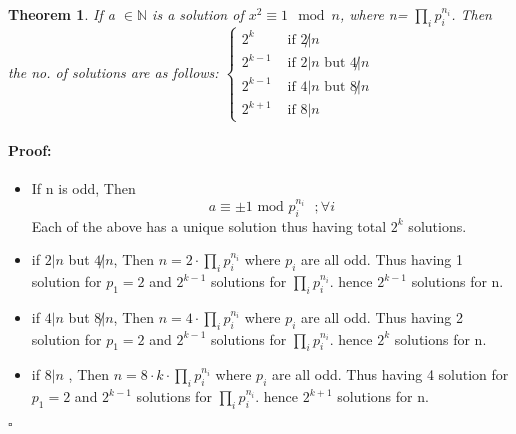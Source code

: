 \documentclass{report}
\newtheorem{theorem}{Theorem}[section]
\renewenvironment{proof}{\paragraph{Proof:}}{\hfill$\square$}
\begin{document}
\begin{theorem}
   
If a $\in \mathbb{N}$ is a solution of $x^2\equiv 1 \mod n$, where n= $\prod_i p_i^{n_i}$. Then the no. of solutions are as follows:
$\begin{cases}
    2^k & \textrm{  if  } 2\not| n\\
    2^{k-1} & \textrm{  if  } 2|n \textrm{  but  } 4\not| n\\
    2^{k-1} & \textrm{  if  } 4|n \textrm{  but  } 8\not|n\\
    2^{k+1} &\textrm{  if  } 8|n
\end{cases}
$
\end{theorem}
\begin{proof}
\begin{itemize}
    \item  If n is odd, Then $$a\equiv \pm 1 \textrm{  mod $p_i^{n_i}  $  }; \forall i   $$ 
    Each of the above has a unique solution thus having total $2^k$ solutions.
    \item if $2|n$ but $4\not|n$, Then $n=2\cdot \prod_i p_i^{n_i}$ where $p_i $ are all odd.
    Thus having 1 solution for $p_1=2$ and $2^{k-1}$ solutions for $\prod_i p_i^{n_i}$. hence $2^{k-1}$ solutions for n. 
    \item if $4|n$ but $8\not|n$, Then $n=4\cdot \prod_i p_i^{n_i}$ where $p_i $ are all odd.
    Thus having 2 solution for $p_1=2$ and $2^{k-1}$ solutions for $\prod_i p_i^{n_i}$. hence $2^{k}$ solutions for n.
    \item if $8|n$ , Then $n=8\cdot k \cdot \prod_i p_i^{n_i}$ where $p_i $ are all odd.
    Thus having 4 solution for $p_1=2$ and $2^{k-1}$ solutions for $\prod_i p_i^{n_i}$. hence $2^{k+1}$ solutions for n. 
 \end{itemize}
   
\end{proof}
\end{document}
